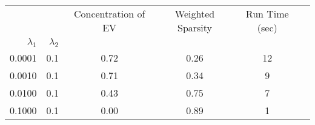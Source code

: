 \begin{tabular}{rr|cccc}
\toprule
       &     &  Concentration of EV &  Weighted Sparsity & Run Time (sec) \\
$\lambda_1$ & $\lambda_2$ &                      &           &                \\
\midrule
0.0001 & 0.1 &                 0.72 &      0.26 &             12 \\
0.0010 & 0.1 &                 0.71 &      0.34 &              9 \\
0.0100 & 0.1 &                 0.43 &      0.75 &              7 \\
0.1000 & 0.1 &                 0.00 &      0.89 &              1 \\
\bottomrule
\end{tabular}
